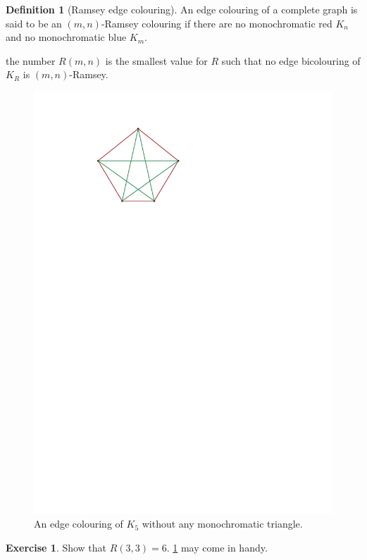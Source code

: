 \documentclass[12pt]{amsart}
\theoremstyle{definition}
\newtheorem{defin}[thm]{Definition}
\newtheorem{exe}[thm]{Exercise}
\begin{document}
\begin{defin}[Ramsey edge colouring]
An edge colouring of a complete graph is said to be an $(m, n)$-Ramsey colouring if there are no monochromatic red $K_n$ and no monochromatic blue $K_m$.

the number $R(m, n)$ is the smallest value for $R$ such that no edge bicolouring of $K_R$ is $(m, n)$-Ramsey.
\end{defin}


\begin{figure}[h]
\includegraphics[scale=1]{../imgs/K5colouring}%
\caption{An edge colouring of $K_5$ without any monochromatic triangle.\label{fig:k5_bicolour}}
\end{figure}


\begin{exe}\label{exe:r33}
Show that $R(3, 3) = 6$.
\cref{fig:k5_bicolour} may come in handy.
\end{exe}
\end{document}
